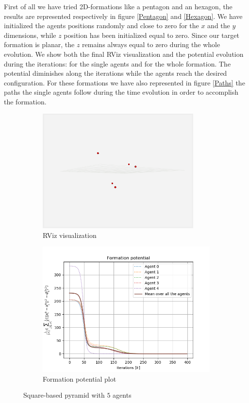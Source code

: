 \documentclass[a4paper,11pt,oneside]{book}
\begin{document}
First of all we have tried 2D-formations like a pentagon and an hexagon, the results are represented respectively in figure \ref{Pentagon} and \ref{Hexagon}. We have initialized the agents positions randomly and close to zero for the $x$ and the $y$ dimensions, while $z$ position has been initialized equal to zero. Since our target formation is planar, the $z$ remains always equal to zero during the whole evolution.
We show both the final RViz visualization and the potential evolution during the iterations: for the single agents and for the whole formation. The potential diminishes along the iterations while the agents reach the desired configuration. 
For these formations we have also represented in figure \ref{Paths} the paths the single agents follow during the time evolution in order to accomplish the formation.

\begin{figure}
\centering
	\begin{subfigure}{0.49\textwidth}	
	\includegraphics[width=0.9\textwidth]{Task-2.2_R-viz_No-Coll-Avoid_Piramid}
	\caption{RViz visualization}
	\end{subfigure}
\hfill
	\begin{subfigure}{0.49\textwidth}	
	\includegraphics[width=\textwidth]{Formation_potential_piramid}
	\caption{Formation potential plot}
	\end{subfigure}
\caption{Square-based pyramid with $5$ agents}
\label{Piramid}
\end{figure}
\end{document}
